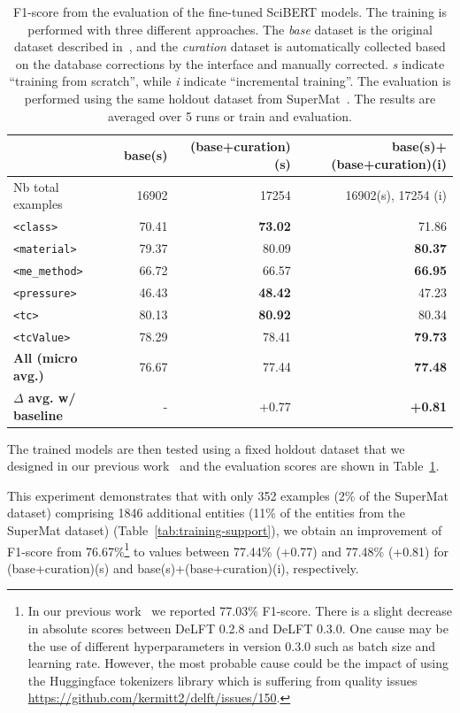 \begin{table}[htbp]
\centering\small
\caption{F1-score from the evaluation of the fine-tuned SciBERT models. The training is performed with three different approaches. 
The \emph{base} dataset is the original dataset described in~\cite{foppiano2021supermat}, and the \emph{curation} dataset is automatically collected based on the database corrections by the interface and manually corrected. \textit{s} indicate ``training from scratch'', while \textit{i} indicate ``incremental training''. 
The evaluation is performed using the same holdout dataset from SuperMat~\cite{foppiano2021supermat}. 
The results are averaged over 5 runs or train and evaluation. }
\begin{tabular}{lrrr}
\toprule
& \textbf{base(s)} & \textbf{(base+curation)(s)} & \textbf{base(s)+(base+curation)(i)} \\ 
\midrule
Nb total examples & 16902 & 17254 & 16902(s), 17254 (i)\\ 
\midrule
\texttt{<class>}        & 70.41         & \textbf{73.02}         & 71.86 \\ 
\texttt{<material>}     & 79.37         & 80.09         & \textbf{80.37} \\ 
\texttt{<me\_method>}   & 66.72         & 66.57         & \textbf{66.95} \\ 
\texttt{<pressure>}     & 46.43         & \textbf{48.42}         & 47.23 \\ 
\texttt{<tc>}           & 80.13         & \textbf{80.92}         & 80.34 \\ 
\texttt{<tcValue>}      & 78.29         & 78.41         & \textbf{79.73} \\ 
\midrule
\textbf{All (micro avg.)} & 76.67       & 77.44         & \textbf{77.48} \\ 
\midrule
\textbf{$\Delta$ avg. w/ baseline}& -   & +0.77     & \textbf{+0.81} \\ 
\bottomrule
\end{tabular}
\label{tab:evaluation-curation-training2}
\end{table}


The trained models are then tested using a fixed holdout dataset that we designed in our previous work~\cite{foppiano2023automatic} and the evaluation scores are shown in Table~\ref{tab:evaluation-curation-training2}.

This experiment demonstrates that with only 352 examples (2\% of the SuperMat dataset) comprising 1846 additional entities (11\% of the entities from the SuperMat dataset) (Table~\ref{tab:training-support}), we obtain an improvement of F1-score from 76.67\%\footnote{In our previous work~\cite{foppiano2023automatic} we reported 77.03\% F1-score. 
There is a slight decrease in absolute scores between DeLFT 0.2.8 and DeLFT 0.3.0. 
One cause may be the use of different hyperparameters in version 0.3.0 such as batch size and learning rate.
However, the most probable cause could be the impact of using the Huggingface tokenizers library which is suffering from quality issues \url{https://github.com/kermitt2/delft/issues/150}.} to values between 77.44\% (+0.77) and 77.48\% (+0.81) for (base+curation)(s) and base(s)+(base+curation)(i), respectively. 


